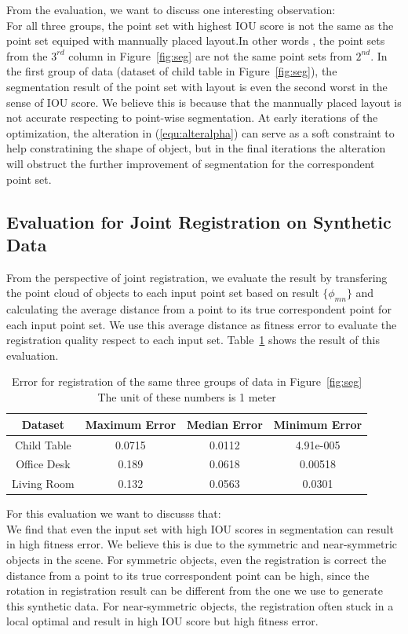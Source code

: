 From the evaluation, we want to discuss one interesting observation:\\
For all three groups, the point set with highest IOU score is not the same as the point set equiped with mannually placed layout.In other words , the point sets from the $3^{rd}$ column in Figure~\ref{fig:seg} are not the same point sets from $2^{nd}$. In the first group of data (dataset of child table in Figure~\ref{fig:seg}), the segmentation result of the point set with layout is even the second worst in the sense of IOU score. We believe this is because that the mannually placed layout is not accurate respecting to point-wise segmentation. At early iterations of the optimization, the alteration in (\ref{equ:alteralpha}) can serve as a soft constraint to help constratining the shape of object, but in the final iterations the alteration will obstruct the further improvement of segmentation for the correspondent point set. 
\subsection{Evaluation for Joint Registration on Synthetic Data}
From the perspective of joint registration, we evaluate the result by transfering the point cloud of objects  to each input point set based on result $\{\phi_{mn}\}$ and calculating the average distance from a point to its true correspondent point for each input point set.  We use this average distance as fitness error to evaluate the registration quality respect to each input set.
Table~\ref{tab:regerror} shows the result of this evaluation.
\begin{table}
\centering
\begin{tabular}{c c c c}
Dataset & Maximum Error & Median Error & Minimum Error \\
\hline
Child Table & 0.0715 & 0.0112 & 4.91e-005 \\   
Office Desk & 0.189  & 0.0618 & 0.00518 \\
Living Room & 0.132  & 0.0563 & 0.0301\\
\end{tabular}
\caption{Error for registration of the same three groups of data in Figure~\ref{fig:seg} The unit of these numbers is 1 meter}
\label{tab:regerror}
\end{table}
For this evaluation we want to discusss that:\\
We find that even the input set with high IOU scores in segmentation can result in high fitness error. We believe this is due to the symmetric and near-symmetric objects in the scene. For symmetric objects, even the registration is correct the distance from a point to its true correspondent point can be high, since the rotation in registration result can be different from the one we use to generate this synthetic data. For near-symmetric objects, the registration often stuck in a local optimal and result in high IOU score but high fitness error.

